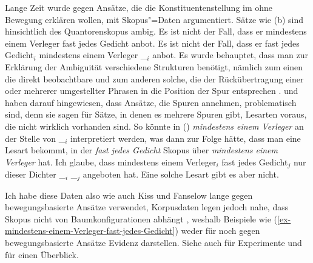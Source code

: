 \begin{exe}
\begin{xlist}
\label{sec-Scrambling-Skopus}

%
Lange Zeit wurde gegen Ansätze, die die Konstituentenstellung im \mf ohne Bewegung erklären wollen,
mit Skopus"=Daten argumentiert. Sätze wie (b) sind hinsichtlich des Quantorenskopus ambig.
\eal
\ex Es ist nicht der Fall, dass er mindestens einem Verleger fast jedes Gedicht anbot.
\ex Es ist nicht der Fall, dass er fast jedes Gedicht$_i$ mindestens einem Verleger \_$_i$ anbot.
\zl
\largerpage
Es wurde behauptet, dass man zur Erklärung der Ambiguität verschiedene Strukturen benötigt, nämlich
zum einen die direkt beobachtbare und zum anderen solche, die der Rückübertragung einer oder
mehrerer umgestellter Phrasen in die Position der Spur entsprechen \citep[185]{Frey93a}.
\citet[]{Kiss2001a} und \citet[Abschnitt~2.6]{Fanselow2001a} haben darauf hingewiesen,
dass Ansätze, die Spuren annehmen, problematisch sind, denn sie sagen für Sätze, in denen es mehrere Spuren gibt, 
Lesarten voraus, die nicht wirklich vorhanden sind.
So könnte \zb in () \emph{mindestens einem Verleger} an der Stelle von \_$_i$ interpretiert werden,
was dann zur Folge hätte, dass man eine Lesart bekommt, in der
\emph{fast jedes Gedicht} Skopus über \emph{mindestens einem Verleger} hat.
\ea
\label{ex-mindestens-einem-Verleger-fast-jedes-Gedicht}
Ich glaube, dass mindestens einem Verleger$_i$ fast jedes Gedicht$_j$ nur dieser Dichter \_$_i$ \_$_j$ angeboten hat.
\z
Eine solche Lesart gibt es aber nicht.

Ich habe diese Daten also wie auch Kiss und Fanselow lange gegen bewegungsbasierte Ansätze verwendet, Korpusdaten legen jedoch nahe,
dass Skopus nicht von Baumkonfigurationen abhängt \citep{Webelhuth2022a}, weshalb Beispiele wie
(\ref{ex-mindestens-einem-Verleger-fast-jedes-Gedicht}) weder für noch gegen bewegungsbasierte
Ansätze Evidenz darstellen. Siehe auch
\citet{FanselowZimmermannPhilipp2022a-u} für Experimente und \citet{Salzmann2025a} für einen Überblick.%
%




\end{xlist}
\end{exe}
